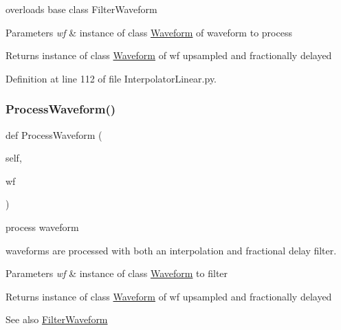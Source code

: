 overloads base class Filter\+Waveform 


\begin{DoxyParams}{Parameters}
{\em wf} & instance of class \hyperlink{namespaceSignalIntegrity_1_1TimeDomain_1_1Waveform}{Waveform} of waveform to process \\
\hline
\end{DoxyParams}
\begin{DoxyReturn}{Returns}
instance of class \hyperlink{namespaceSignalIntegrity_1_1TimeDomain_1_1Waveform}{Waveform} of wf upsampled and fractionally delayed 
\end{DoxyReturn}


Definition at line 112 of file Interpolator\+Linear.\+py.

\mbox{\label{classSignalIntegrity_1_1TimeDomain_1_1Filters_1_1InterpolatorLinear_1_1InterpolatorFractionalDelayFilterLinear_ae09bec195c9cb1d5819e73b7be169b11}} 
\subsubsection{\texorpdfstring{Process\+Waveform()}{ProcessWaveform()}}
{\footnotesize\ttfamily def Process\+Waveform (\begin{DoxyParamCaption}\item[{}]{self,  }\item[{}]{wf }\end{DoxyParamCaption})}



process waveform 

waveforms are processed with both an interpolation and fractional delay filter.


\begin{DoxyParams}{Parameters}
{\em wf} & instance of class \hyperlink{namespaceSignalIntegrity_1_1TimeDomain_1_1Waveform}{Waveform} to filter \\
\hline
\end{DoxyParams}
\begin{DoxyReturn}{Returns}
instance of class \hyperlink{namespaceSignalIntegrity_1_1TimeDomain_1_1Waveform}{Waveform} of wf upsampled and fractionally delayed
\end{DoxyReturn}
\begin{DoxySeeAlso}{See also}
\hyperlink{classSignalIntegrity_1_1TimeDomain_1_1Filters_1_1InterpolatorLinear_1_1InterpolatorFractionalDelayFilterLinear_a84e73c18250ca4a61482f94ad61e735b}{Filter\+Waveform} 
\end{DoxySeeAlso}


